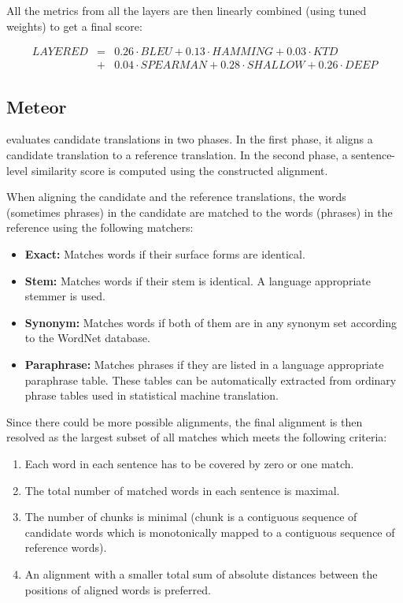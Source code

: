 All the metrics from all the layers are then linearly combined (using tuned weights)
to get a final  score: 

\begin{eqnarray*}
    LAYERED & = & 0.26 \cdot BLEU + 0.13 \cdot HAMMING + 0.03 \cdot KTD \\ 
            & + & 0.04 \cdot SPEARMAN + 0.28 \cdot SHALLOW + 0.26 \cdot DEEP 
\end{eqnarray*}

\subsection{Meteor}

  evaluates candidate translations
in two phases. In the first phase, it aligns a candidate translation to a
reference translation. In the second phase, a sentence-level similarity score
is computed using the constructed alignment. 

When aligning the candidate and the reference translations, the words
(sometimes phrases) in the candidate are matched to the words (phrases) in the
reference using the following matchers:

\begin{itemize}
    \item \textbf{Exact:} Matches words if their surface forms are identical.
    \item \textbf{Stem:} Matches words if their stem is identical. A language appropriate
        stemmer is used.
    \item \textbf{Synonym:} Matches words if both of them are in any synonym set according 
        to the WordNet database.
    \item \textbf{Paraphrase:} Matches phrases if they are listed in a language appropriate 
        paraphrase table. These tables can be automatically extracted from ordinary phrase tables
        used in statistical machine translation. 
\end{itemize}

Since there could be more possible alignments, the final alignment is then
resolved as the largest subset of all matches which meets the following
criteria:

\begin{enumerate}
    \item Each word in each sentence has to be covered by zero or one match.
    \item The total number of matched words in each sentence is maximal.
    \item The number of chunks is minimal (chunk is a contiguous sequence of
        candidate words which is monotonically mapped to a contiguous
        sequence of reference words).
    \item An alignment with a smaller total sum of absolute distances between
        the positions of aligned words is preferred. 
\end{enumerate}

